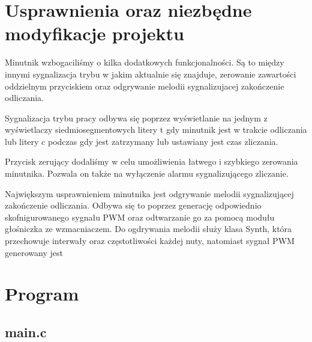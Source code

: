 \documentclass[fleqn]{article}
\begin{document}


\section{Usprawnienia oraz niezbędne modyfikacje projektu}
Minutnik wzbogaciliśmy o kilka dodatkowych funkcjonalności. Są to między innymi sygnalizacja trybu w jakim aktualnie się znajduje, zerowanie zawartości oddzielnym przyciskiem oraz odgrywanie melodii sygnalizujacej zakończenie odliczania.

Sygnalizacja trybu pracy odbywa się poprzez wyświetlanie na jednym z wyświetlaczy siedmiosegmentowych litery t gdy minutnik jest w trakcie odliczania lub litery c podczas gdy jest zatrzymany lub ustawiany jest czas zliczania.

Przycisk zerujący dodaliśmy w celu umożliwienia łatwego i szybkiego zerowania minutnika. Pozwala on także na wyłączenie alarmu sygnalizującego zliczanie.

Największym usprawnieniem minutnika jest odgrywanie melodii sygnalizującej zakończenie odliczania. Odbywa się to poprzez generację odpowiednio skofnigurowanego sygnału PWM oraz odtwarzanie go za pomocą modułu głośniczka ze wzmacniaczem. Do ogdrywania melodii służy klasa Synth, która przechowuje interwały oraz częstotliwości każdej nuty, natomiast sygnał PWM generowany jest

\pagebreak

\section{Program}
\subsection{main.c}

\noindent\begin{minipage}[t]{.45\textwidth}
	
\end{minipage}\hfill
\noindent\begin{minipage}[t]{.45\textwidth}
	
\end{minipage}\hfill
\pagebreak
\end{document}

